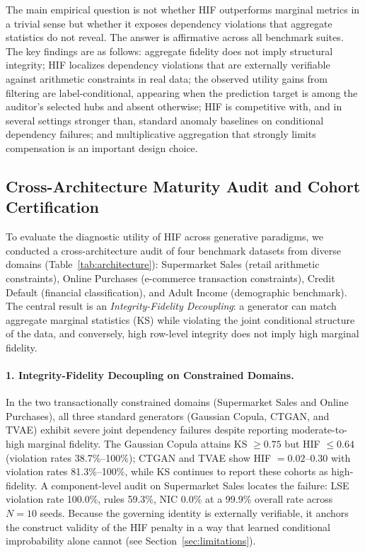 \documentclass[pdflatex,sn-mathphys-num]{sn-jnl}
\theoremstyle{thmstyleone}%
\theoremstyle{thmstyletwo}%
\theoremstyle{thmstylethree}%
\begin{document}
The main empirical question is not whether HIF outperforms marginal metrics in a trivial sense but whether it exposes dependency violations that aggregate statistics do not reveal. The answer is affirmative across all benchmark suites. The key findings are as follows: aggregate fidelity does not imply structural integrity; HIF localizes dependency violations that are externally verifiable against arithmetic constraints in real data; the observed utility gains from filtering are label-conditional, appearing when the prediction target is among the auditor's selected hubs and absent otherwise; HIF is competitive with, and in several settings stronger than, standard anomaly baselines on conditional dependency failures; and multiplicative aggregation that strongly limits compensation is an important design choice.

\subsection{Cross-Architecture Maturity Audit and Cohort Certification}\label{sec:cross_arch}

To evaluate the diagnostic utility of HIF across generative paradigms, we conducted a cross-architecture audit of four benchmark datasets from diverse domains (Table~\ref{tab:architecture}): Supermarket Sales (retail arithmetic constraints), Online Purchases (e-commerce transaction constraints), Credit Default (financial classification), and Adult Income (demographic benchmark). The central result is an \emph{Integrity-Fidelity Decoupling}: a generator can match aggregate marginal statistics (KS) while violating the joint conditional structure of the data, and conversely, high row-level integrity does not imply high marginal fidelity.

\paragraph{1. Integrity-Fidelity Decoupling on Constrained Domains.} In the two transactionally constrained domains (Supermarket Sales and Online Purchases), all three standard generators (Gaussian Copula, CTGAN, and TVAE) exhibit severe joint dependency failures despite reporting moderate-to-high marginal fidelity. The Gaussian Copula attains KS $\ge 0.75$ but HIF $\le 0.64$ (violation rates 38.7\%--100\%); CTGAN and TVAE show HIF $= 0.02\text{--}0.30$ with violation rates 81.3\%--100\%, while KS continues to report these cohorts as high-fidelity. A component-level audit on Supermarket Sales locates the failure: LSE violation rate 100.0\%, rules 59.3\%, NIC 0.0\% at a 99.9\% overall rate across $N=10$ seeds. Because the governing identity is externally verifiable, it anchors the construct validity of the HIF penalty in a way that learned conditional improbability alone cannot (see Section~\ref{sec:limitations}).
\end{document}
